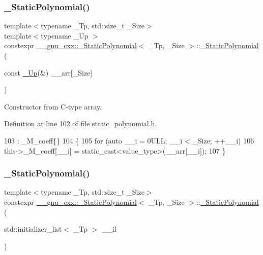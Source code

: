 \subsubsection{\texorpdfstring{\+\_\+\+Static\+Polynomial()}{\_StaticPolynomial()}\hspace{0.1cm}{\footnotesize\ttfamily [5/8]}}
{\footnotesize\ttfamily template$<$typename \+\_\+\+Tp, std\+::size\+\_\+t \+\_\+\+Size$>$ \\
template$<$typename \+\_\+\+Up $>$ \\
constexpr \hyperlink{class____gnu__cxx_1_1__StaticPolynomial}{\+\_\+\+\_\+gnu\+\_\+cxx\+::\+\_\+\+Static\+Polynomial}$<$ \+\_\+\+Tp, \+\_\+\+Size $>$\+::\hyperlink{class____gnu__cxx_1_1__StaticPolynomial}{\+\_\+\+Static\+Polynomial} (\begin{DoxyParamCaption}\item[{const \hyperlink{namespace____gnu__cxx_ab693ea357b6429b331e0bf09f9442385}{\+\_\+\+Up}(\&)}]{\+\_\+\+\_\+arr\mbox{[}\+\_\+\+Size\mbox{]} }\end{DoxyParamCaption})\hspace{0.3cm}{\ttfamily [inline]}}

Constructor from C-\/type array. 

Definition at line 102 of file static\+\_\+polynomial.\+h.


\begin{DoxyCode}
103         : \_M\_coeff\{\}
104         \{
105           \textcolor{keywordflow}{for} (\textcolor{keyword}{auto} \_\_i = 0ULL; \_\_i < \_Size; ++\_\_i)
106             this->\_M\_coeff[\_\_i] = static\_cast<value\_type>(\_\_arr[\_\_i]);
107         \}
\end{DoxyCode}
\mbox{\label{class____gnu__cxx_1_1__StaticPolynomial_ab713e4b435e6d0a3e080eeaf668dcda7}} 
\subsubsection{\texorpdfstring{\+\_\+\+Static\+Polynomial()}{\_StaticPolynomial()}\hspace{0.1cm}{\footnotesize\ttfamily [6/8]}}
{\footnotesize\ttfamily template$<$typename \+\_\+\+Tp, std\+::size\+\_\+t \+\_\+\+Size$>$ \\
constexpr \hyperlink{class____gnu__cxx_1_1__StaticPolynomial}{\+\_\+\+\_\+gnu\+\_\+cxx\+::\+\_\+\+Static\+Polynomial}$<$ \+\_\+\+Tp, \+\_\+\+Size $>$\+::\hyperlink{class____gnu__cxx_1_1__StaticPolynomial}{\+\_\+\+Static\+Polynomial} (\begin{DoxyParamCaption}\item[{std\+::initializer\+\_\+list$<$ \+\_\+\+Tp $>$}]{\+\_\+\+\_\+il }\end{DoxyParamCaption})\hspace{0.3cm}{\ttfamily [inline]}}

